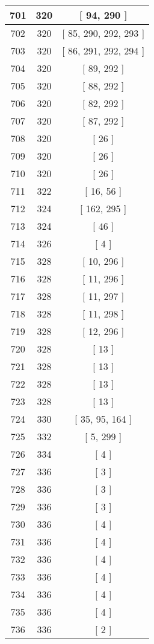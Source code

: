 \begin{center}
\begin{longtable}[H]{|| c c c ||}
\hline
701 & 320 & [ 94, 290 ] \\ 
\hline
702 & 320 & [ 85, 290, 292, 293 ] \\ 
\hline
703 & 320 & [ 86, 291, 292, 294 ] \\ 
\hline
704 & 320 & [ 89, 292 ] \\ 
\hline
705 & 320 & [ 88, 292 ] \\ 
\hline
706 & 320 & [ 82, 292 ] \\ 
\hline
707 & 320 & [ 87, 292 ] \\ 
\hline
708 & 320 & [ 26 ] \\ 
\hline
709 & 320 & [ 26 ] \\ 
\hline
710 & 320 & [ 26 ] \\ 
\hline
711 & 322 & [ 16, 56 ] \\ 
\hline
712 & 324 & [ 162, 295 ] \\ 
\hline
713 & 324 & [ 46 ] \\ 
\hline
714 & 326 & [ 4 ] \\ 
\hline
715 & 328 & [ 10, 296 ] \\ 
\hline
716 & 328 & [ 11, 296 ] \\ 
\hline
717 & 328 & [ 11, 297 ] \\ 
\hline
718 & 328 & [ 11, 298 ] \\ 
\hline
719 & 328 & [ 12, 296 ] \\ 
\hline
720 & 328 & [ 13 ] \\ 
\hline
721 & 328 & [ 13 ] \\ 
\hline
722 & 328 & [ 13 ] \\ 
\hline
723 & 328 & [ 13 ] \\ 
\hline
724 & 330 & [ 35, 95, 164 ] \\ 
\hline
725 & 332 & [ 5, 299 ] \\ 
\hline
726 & 334 & [ 4 ] \\ 
\hline
727 & 336 & [ 3 ] \\ 
\hline
728 & 336 & [ 3 ] \\ 
\hline
729 & 336 & [ 3 ] \\ 
\hline
730 & 336 & [ 4 ] \\ 
\hline
731 & 336 & [ 4 ] \\ 
\hline
732 & 336 & [ 4 ] \\ 
\hline
733 & 336 & [ 4 ] \\ 
\hline
734 & 336 & [ 4 ] \\ 
\hline
735 & 336 & [ 4 ] \\ 
\hline
736 & 336 & [ 2 ] \\ 

\end{longtable}
\end{center}
